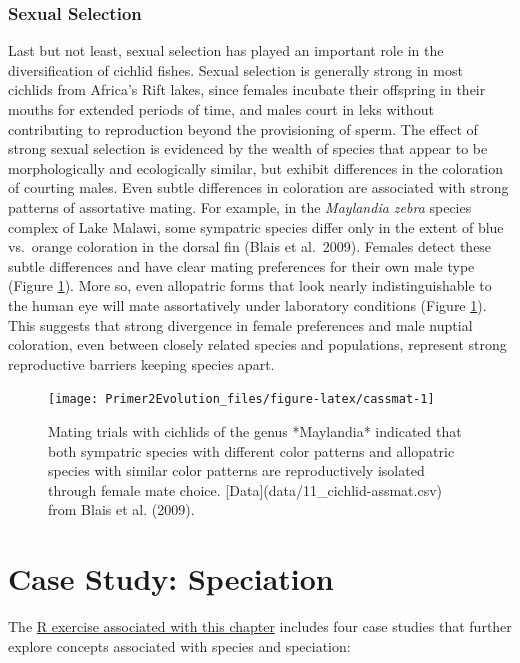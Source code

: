 \documentclass[
]{book}
\begin{document}
\hypertarget{sexual-selection-1}{%
\subsubsection*{Sexual Selection}\label{sexual-selection-1}}

Last but not least, sexual selection has played an important role in the diversification of cichlid fishes. Sexual selection is generally strong in most cichlids from Africa's Rift lakes, since females incubate their offspring in their mouths for extended periods of time, and males court in leks without contributing to reproduction beyond the provisioning of sperm. The effect of strong sexual selection is evidenced by the wealth of species that appear to be morphologically and ecologically similar, but exhibit differences in the coloration of courting males. Even subtle differences in coloration are associated with strong patterns of assortative mating. For example, in the \emph{Maylandia zebra} species complex of Lake Malawi, some sympatric species differ only in the extent of blue vs.~orange coloration in the dorsal fin (Blais et al.~2009). Females detect these subtle differences and have clear mating preferences for their own male type (Figure \ref{fig:cassmat}). More so, even allopatric forms that look nearly indistinguishable to the human eye will mate assortatively under laboratory conditions (Figure \ref{fig:cassmat}). This suggests that strong divergence in female preferences and male nuptial coloration, even between closely related species and populations, represent strong reproductive barriers keeping species apart.

\begin{figure}
\texttt{[image: Primer2Evolution\_files/figure-latex/cassmat-1]} \caption{Mating trials with cichlids of the genus *Maylandia* indicated that both sympatric species with different color patterns and allopatric species with similar color patterns are reproductively isolated through female mate choice. [Data](data/11_cichlid-assmat.csv) from Blais et al. (2009).}\label{fig:cassmat}
\end{figure}

\hypertarget{case-study-speciation}{%
\section{Case Study: Speciation}\label{case-study-speciation}}

The \href{exercises/BIOL520-ex10.zip}{R exercise associated with this chapter} includes four case studies that further explore concepts associated with species and speciation:
\end{document}
